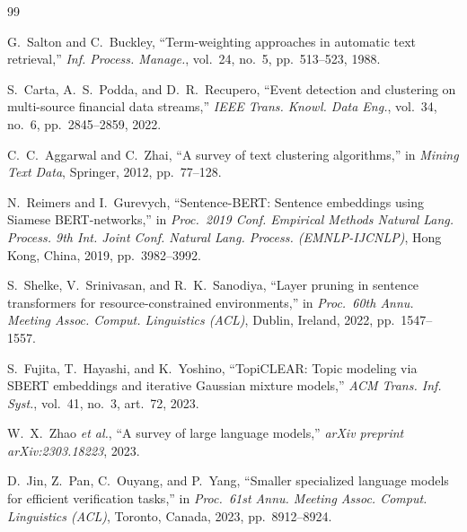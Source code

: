 \documentclass[conference]{IEEEtran}
\begin{document}
\begin{thebibliography}{99}
\footnotesize
\setlength{\itemsep}{1pt}
\setlength{\parskip}{0pt}

G.~Salton and C.~Buckley, ``Term-weighting approaches in automatic text retrieval,'' \textit{Inf. Process. Manage.}, vol.~24, no.~5, pp.\ 513--523, 1988.

S.~Carta, A.~S.~Podda, and D.~R.~Recupero, ``Event detection and clustering on multi-source financial data streams,'' \textit{IEEE Trans. Knowl. Data Eng.}, vol.~34, no.~6, pp.\ 2845--2859, 2022.

C.~C.~Aggarwal and C.~Zhai, ``A survey of text clustering algorithms,'' in \textit{Mining Text Data}, Springer, 2012, pp.\ 77--128.

N.~Reimers and I.~Gurevych, ``Sentence-BERT: Sentence embeddings using Siamese BERT-networks,'' in \textit{Proc.\ 2019 Conf. Empirical Methods Natural Lang. Process. 9th Int. Joint Conf. Natural Lang. Process. (EMNLP-IJCNLP)}, Hong Kong, China, 2019, pp.\ 3982--3992.

S.~Shelke, V.~Srinivasan, and R.~K.~Sanodiya, ``Layer pruning in sentence transformers for resource-constrained environments,'' in \textit{Proc.\ 60th Annu. Meeting Assoc. Comput. Linguistics (ACL)}, Dublin, Ireland, 2022, pp.\ 1547--1557.

S.~Fujita, T.~Hayashi, and K.~Yoshino, ``TopiCLEAR: Topic modeling via SBERT embeddings and iterative Gaussian mixture models,'' \textit{ACM Trans. Inf. Syst.}, vol.~41, no.~3, art.~72, 2023.

W.~X.~Zhao \textit{et al.}, ``A survey of large language models,'' \textit{arXiv preprint arXiv:2303.18223}, 2023.

D.~Jin, Z.~Pan, C.~Ouyang, and P.~Yang, ``Smaller specialized language models for efficient verification tasks,'' in \textit{Proc.\ 61st Annu. Meeting Assoc. Comput. Linguistics (ACL)}, Toronto, Canada, 2023, pp.\ 8912--8924.

\end{thebibliography}
\end{document}
